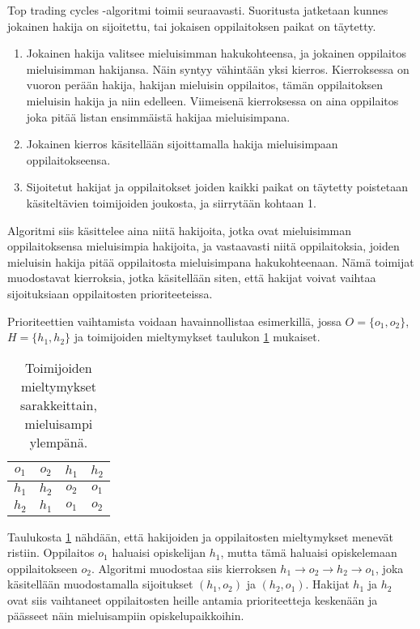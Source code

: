 \documentclass[twoside]{tktltiki}
\begin{document}
Top trading cycles -algoritmi toimii seuraavasti. Suoritusta jatketaan
kunnes jokainen hakija on sijoitettu, tai jokaisen oppilaitoksen
paikat on täytetty.
\begin{enumerate}

\item Jokainen hakija valitsee mieluisimman hakukohteensa, ja jokainen
  oppilaitos mieluisimman hakijansa. Näin syntyy vähintään yksi
  kierros. Kierroksessa on vuoron perään hakija, hakijan mieluisin
  oppilaitos, tämän oppilaitoksen mieluisin hakija ja niin edelleen.
  Viimeisenä kierroksessa on aina oppilaitos joka pitää listan
  ensimmäistä hakijaa mieluisimpana.

\item Jokainen kierros käsitellään sijoittamalla hakija mieluisimpaan
  oppilaitokseensa.

\item Sijoitetut hakijat ja oppilaitokset joiden kaikki paikat on
  täytetty poistetaan käsiteltävien toimijoiden joukosta, ja
  siirrytään kohtaan 1.
\end{enumerate}

Algoritmi siis käsittelee aina niitä hakijoita, jotka ovat
mieluisimman oppilaitoksensa mieluisimpia hakijoita, ja vastaavasti
niitä oppilaitoksia, joiden mieluisin hakija pitää oppilaitosta
mieluisimpana hakukohteenaan. Nämä toimijat muodostavat kierroksia,
jotka käsitellään siten, että hakijat voivat vaihtaa sijoituksiaan
oppilaitosten prioriteeteissa.

Prioriteettien vaihtamista voidaan havainnollistaa esimerkillä, jossa
$O = \{o_1, o_2\}$, $H = \{h_1, h_2\}$ ja toimijoiden mieltymykset
taulukon \ref{top_esimerkki} mukaiset.

\begin{table}[]
  \begin{center}
    \begin{tabular}{ c c | c c }
    $o_1$ & $o_2$ & $h_1$ & $h_2$ \\
    \hline
    $h_1$ & $h_2$ & $o_2$ & $o_1$ \\
    $h_2$ & $h_1$ & $o_1$ & $o_2$
    \end{tabular}
    \caption{Toimijoiden mieltymykset sarakkeittain, mieluisampi ylempänä.}
    \label{top_esimerkki}
  \end{center}
\end{table}

\enlargethispage{\baselineskip}
Taulukosta \ref{top_esimerkki} nähdään, että hakijoiden ja
oppilaitosten mieltymykset menevät ristiin. Oppilaitos $o_1$ haluaisi
opiskelijan $h_1$, mutta tämä haluaisi opiskelemaan oppilaitokseen
$o_2$. Algoritmi muodostaa siis kierroksen $h_1 \rightarrow o_2
\rightarrow h_2 \rightarrow o_1$, joka käsitellään muodostamalla
sijoitukset $(h_1, o_2)$ ja $(h_2, o_1)$. Hakijat $h_1$ ja $h_2$ ovat
siis vaihtaneet oppilaitosten heille antamia prioriteetteja keskenään
ja päässeet näin mieluisampiin opiskelupaikkoihin.
\end{document}
